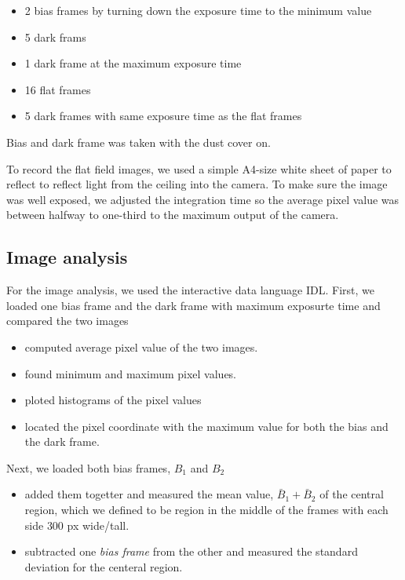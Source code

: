\documentclass{emulateapj}
\begin{document}
\begin{itemize}
\item 2 bias frames by turning down the exposure time to the minimum value
\item 5 dark frams 
\item 1 dark frame at the maximum exposure time
\item 16 flat frames
\item 5 dark frames with same exposure time as the flat frames
\end{itemize}

Bias and dark frame was taken with the dust cover on.

To record the flat field images, we used a simple A4-size white sheet of paper to reflect to reflect light from the ceiling into the camera. To make sure the image was well exposed, we adjusted the integration time so the average pixel value was between halfway to one-third to the maximum output of the camera.


\subsection{Image analysis}

For the image analysis, we used the interactive data language IDL. First, we loaded one bias frame and the dark frame with maximum exposurte time and compared the two images

\begin{itemize}
\item computed average pixel value of the two images.
\item found minimum and maximum pixel values.
\item ploted histograms of the pixel values
\item located the pixel coordinate with the maximum value for both the bias and the dark frame.
\end{itemize}

  Next, we loaded both bias frames, $B_1$ and $B_2$
\begin{itemize}
\item added them togetter and measured the mean value, $\bar{B}_1 + \bar{B}_2$ of the central region, which we defined to be region in the middle of the frames with each side $300$ px wide/tall.
\item subtracted one \textit{bias frame} from the other and measured the standard deviation for the centeral region.
\end{itemize}
\end{document}
